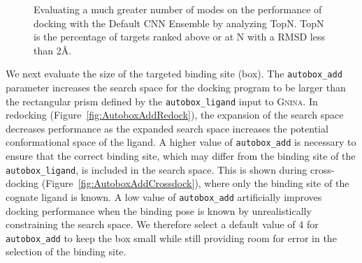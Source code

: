 \documentclass[linenumbers,doublespacing]{bmcart}
\begin{document}
\begin{figure}[tb]
	\caption{Evaluating a much greater number of modes on the performance of docking with the Default CNN Ensemble by analyzing TopN. TopN is the percentage of targets ranked above or at N with a RMSD less than 2{\AA}.}
	\label{fig:num modes}
\end{figure}

We next evaluate the size of the targeted binding site (box). The \texttt{autobox\_add} parameter increases the search space for the docking program to be larger than the rectangular prism defined by the \texttt{autobox\_ligand} input to \textsc{Gnina}. In redocking (Figure~\ref{fig:AutoboxAddRedock}), the expansion of the search space decreases performance as the expanded search space increases the potential conformational space of the ligand. A higher value of \texttt{autobox\_add} is necessary to ensure that the correct binding site, which may differ from the binding site of the \texttt{autobox\_ligand}, is included in the search space. This is shown during cross-docking (Figure~\ref{fig:AutoboxAddCrossdock}), where only the binding site of the cognate ligand is known. A low value of \texttt{autobox\_add} artificially improves docking performance when the binding pose is known by unrealistically constraining the search space. We therefore select a default value of 4 for \texttt{autobox\_add} to keep the box small while still providing room for error in the selection of the binding site.
\end{document}
